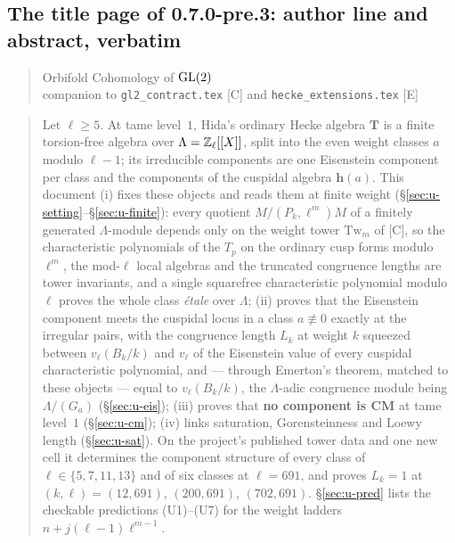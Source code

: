 \documentclass[11pt]{article}
\newcommand{\Iw}{\Lambda}                         %
\newcommand{\hcusp}{\mathbf{h}}                   %
\newcommand{\Tu}{\mathbf{T}}                      %
\newcommand{\Zl}{\Z_\ell}
\begin{document}
\subsection{The title page of 0.7.0-pre.3: author line and abstract, verbatim}
\begin{quote}
Orbifold Cohomology of $\mathrm{GL}(2)$\\ companion to \texttt{gl2\_contract.tex} [C] and \texttt{hecke\_extensions.tex} [E]
\end{quote}
\begin{quote}
Let $\ell\ge5$. At tame level~$1$, Hida's ordinary Hecke algebra $\Tu$ is a finite torsion-free algebra over
$\Iw=\Zl[[X]]$, split into the even weight classes $a$ modulo $\ell-1$; its irreducible components are one
Eisenstein component per class and the components of the cuspidal algebra $\hcusp(a)$. This document (i) fixes
these objects and reads them at finite weight (\S\ref{sec:u-setting}--\S\ref{sec:u-finite}): every quotient
$M/(P_k,\ell^m)M$ of a finitely generated $\Iw$-module depends only on the weight tower $\mathrm{Tw}_m$ of [C], so
the characteristic polynomials of the $T_p$ on the ordinary cusp forms modulo $\ell^m$, the mod-$\ell$ local
algebras and the truncated congruence lengths are tower invariants, and a single squarefree characteristic
polynomial modulo $\ell$ proves the whole class \emph{étale} over $\Iw$; (ii) proves that the Eisenstein component
meets the cuspidal locus in a class $a\not\equiv0$ exactly at the irregular pairs, with the congruence length
$L_k$ at weight $k$ squeezed between $v_\ell(B_k/k)$ and $v_\ell$ of the Eisenstein value of every cuspidal
characteristic polynomial, and --- through Emerton's theorem, matched to these objects --- equal to $v_\ell(B_k/k)$, the $\Iw$-adic congruence module being
$\Iw/(G_a)$ (\S\ref{sec:u-eis}); (iii) proves that \textbf{no component is CM} at tame level~$1$
(\S\ref{sec:u-cm}); (iv) links saturation, Gorensteinness and Loewy length (\S\ref{sec:u-sat}). On the project's
published tower data and one new cell it determines the component structure of every class of $\ell\in\{5,7,11,13\}$
and of six classes at $\ell=691$, and proves $L_k=1$ at $(k,\ell)=(12,691)$, $(200,691)$, $(702,691)$.
\S\ref{sec:u-pred} lists the checkable predictions (U1)--(U7) for the weight ladders $n+j(\ell-1)\ell^{m-1}$.
\end{quote}
\end{document}
